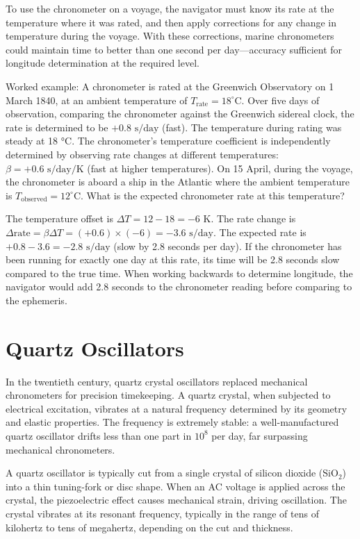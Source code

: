 To use the chronometer on a voyage, the navigator must know its rate at the temperature where it was rated, and then apply corrections for any change in temperature during the voyage. With these corrections, marine chronometers could maintain time to better than one second per day—accuracy sufficient for longitude determination at the required level.

Worked example: A chronometer is rated at the Greenwich Observatory on 1 March 1840, at an ambient temperature of $T_{\text{rate}} = 18 ^{\circ}\text{C}$. Over five days of observation, comparing the chronometer against the Greenwich sidereal clock, the rate is determined to be $+0.8 \text{ s/day}$ (fast). The temperature during rating was steady at 18 °C. The chronometer's temperature coefficient is independently determined by observing rate changes at different temperatures: $\beta = +0.6 \text{ s/day}/\text{K}$ (fast at higher temperatures). On 15 April, during the voyage, the chronometer is aboard a ship in the Atlantic where the ambient temperature is $T_{\text{observed}} = 12 ^{\circ}\text{C}$. What is the expected chronometer rate at this temperature?

The temperature offset is $\Delta T = 12 - 18 = -6 \text{ K}$. The rate change is $\Delta \text{rate} = \beta \Delta T = (+0.6) \times (-6) = -3.6 \text{ s/day}$. The expected rate is $+0.8 - 3.6 = -2.8 \text{ s/day}$ (slow by 2.8 seconds per day). If the chronometer has been running for exactly one day at this rate, its time will be 2.8 seconds slow compared to the true time. When working backwards to determine longitude, the navigator would add 2.8 seconds to the chronometer reading before comparing to the ephemeris.

\section{Quartz Oscillators}

In the twentieth century, quartz crystal oscillators replaced mechanical chronometers for precision timekeeping. A quartz crystal, when subjected to electrical excitation, vibrates at a natural frequency determined by its geometry and elastic properties. The frequency is extremely stable: a well-manufactured quartz oscillator drifts less than one part in $10^8$ per day, far surpassing mechanical chronometers.

A quartz oscillator is typically cut from a single crystal of silicon dioxide ($\text{SiO}_2$) into a thin tuning-fork or disc shape. When an AC voltage is applied across the crystal, the piezoelectric effect causes mechanical strain, driving oscillation. The crystal vibrates at its resonant frequency, typically in the range of tens of kilohertz to tens of megahertz, depending on the cut and thickness.


